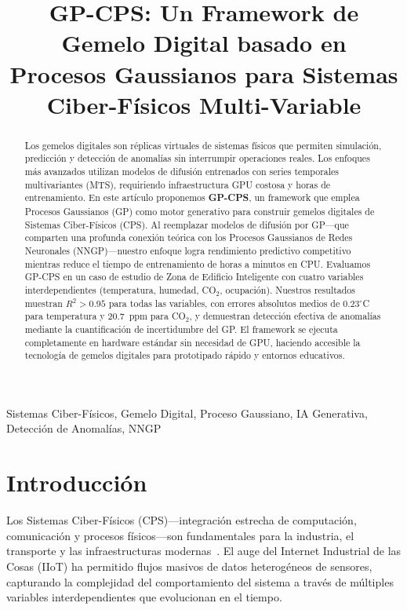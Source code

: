 \documentclass[conference]{IEEEtran}
\title{GP-CPS: Un Framework de Gemelo Digital basado en\\ Procesos Gaussianos para Sistemas Ciber-Físicos Multi-Variable}
\author{\IEEEauthorblockN{J. Calataiut-Cl\raisebox{0.5mm}{\noindent\rule{3mm}{0.5pt}}i\raisebox{0.5mm}{\noindent\rule{3mm}{0.5pt}}}
\IEEEauthorblockA{Departamento de Matemáticas Avanzadas\\
Universidad Politécnica\\
Email: jcalataiut-cli@github.com}
}
\begin{document}
\maketitle

\begin{abstract}
Los gemelos digitales son réplicas virtuales de sistemas físicos que permiten simulación, predicción y detección de anomalías sin interrumpir operaciones reales. Los enfoques más avanzados utilizan modelos de difusión entrenados con series temporales multivariantes (MTS), requiriendo infraestructura GPU costosa y horas de entrenamiento. En este artículo proponemos \textbf{GP-CPS}, un framework que emplea Procesos Gaussianos (GP) como motor generativo para construir gemelos digitales de Sistemas Ciber-Físicos (CPS). Al reemplazar modelos de difusión por GP---que comparten una profunda conexión teórica con los Procesos Gaussianos de Redes Neuronales (NNGP)---nuestro enfoque logra rendimiento predictivo competitivo mientras reduce el tiempo de entrenamiento de horas a minutos en CPU. Evaluamos GP-CPS en un caso de estudio de Zona de Edificio Inteligente con cuatro variables interdependientes (temperatura, humedad, CO$_2$, ocupación). Nuestros resultados muestran $R^2 > 0.95$ para todas las variables, con errores absolutos medios de $0.23^\circ$C para temperatura y 20.7~ppm para CO$_2$, y demuestran detección efectiva de anomalías mediante la cuantificación de incertidumbre del GP. El framework se ejecuta completamente en hardware estándar sin necesidad de GPU, haciendo accesible la tecnología de gemelos digitales para prototipado rápido y entornos educativos.
\end{abstract}

\begin{IEEEkeywords}
Sistemas Ciber-Físicos, Gemelo Digital, Proceso Gaussiano, IA Generativa, Detección de Anomalías, NNGP
\end{IEEEkeywords}

\section{Introducción}
\label{sec:introduccion}

Los Sistemas Ciber-Físicos (CPS)---integración estrecha de computación, comunicación y procesos físicos---son fundamentales para la industria, el transporte y las infraestructuras modernas~\cite{lee2015, zhang2022}. El auge del Internet Industrial de las Cosas (IIoT) ha permitido flujos masivos de datos heterogéneos de sensores, capturando la complejidad del comportamiento del sistema a través de múltiples variables interdependientes que evolucionan en el tiempo.
\end{document}
